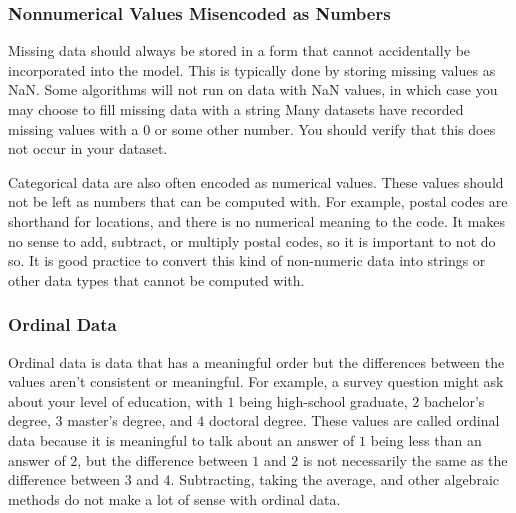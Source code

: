 \subsubsection*{Nonnumerical Values Misencoded as Numbers}
Missing data should always be stored in a form that cannot accidentally be incorporated into the model.
This is typically done by storing missing values as NaN.
Some algorithms will not run on data with NaN values, in which case you may choose to fill missing data with a string 
Many datasets have recorded missing values with a $0$ or some other number. You should verify that this does not occur in your dataset.


Categorical data are also often encoded as numerical values.
These values should not be left as numbers that can be computed with.
For example, postal codes are shorthand for locations, and there is no numerical meaning to the code.
It makes no sense to add, subtract, or multiply postal codes, so it is important to not do so.
It is good practice to convert this kind of non-numeric data into strings or other data types that cannot be computed with.


\subsubsection*{Ordinal Data}

Ordinal data is data that has a meaningful order but the differences between the values aren’t consistent or meaningful.
For example, a survey question might ask about your level of education, with $1$ being high-school graduate, $2$ bachelor’s degree, $3$ master’s degree, and $4$ doctoral degree.
These values are called ordinal data because it is meaningful to talk about an answer of $1$ being less than an answer of $2$, but the difference between $1$ and $2$ is not necessarily the same as the difference between $3$ and $4$.
Subtracting, taking the average, and other algebraic methods do not make a lot of sense with ordinal data.


